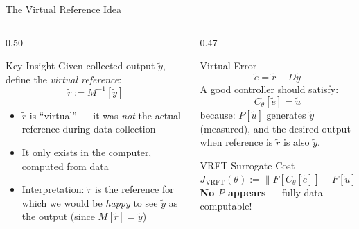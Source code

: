 \documentclass[aspectratio=169]{beamer}
\newcommand{\highlight}[1]{{\color{accentgreen!70!black}\textbf{#1}}}
\newcommand{\JJ}{J_{\mathrm{VRFT}}}
\begin{document}
\begin{frame}{The Virtual Reference Idea}
  \begin{columns}[T]
    \begin{column}{0.50\textwidth}
      \begin{block}{Key Insight}
        Given collected output $\tilde{y}$, define the \emph{virtual reference}:
        \[
          \tilde{r} := M^{-1}[\tilde{y}]
        \]
        \begin{itemize}
          \item $\tilde{r}$ is ``virtual'' --- it was \emph{not} the actual reference during data collection
          \item It only exists in the computer, computed from data
          \item Interpretation: $\tilde{r}$ is the reference for which we would be \emph{happy} to see $\tilde{y}$ as the output (since $M[\tilde{r}] = \tilde{y}$)
        \end{itemize}
      \end{block}
    \end{column}
    \begin{column}{0.47\textwidth}
      \begin{exampleblock}{Virtual Error}
        \[
          \tilde{e} = \tilde{r} - D\tilde{y}
        \]
        A good controller should satisfy:
        \[ C_\theta[\tilde{e}] = \tilde{u} \]
        because: $P[\tilde{u}]$ generates $\tilde{y}$ (measured), and the desired output when reference is $\tilde{r}$ is also $\tilde{y}$.
      \end{exampleblock}
      \vspace{0.3em}
      \begin{block}{VRFT Surrogate Cost}
        \[
          \JJ(\theta) := \bigl\|F[C_\theta[\tilde{e}]] - F[\tilde{u}]\bigr\|^2
        \]
        \highlight{No $P$ appears} --- fully data-computable!
      \end{block}
    \end{column}
  \end{columns}
\end{frame}
\end{document}
